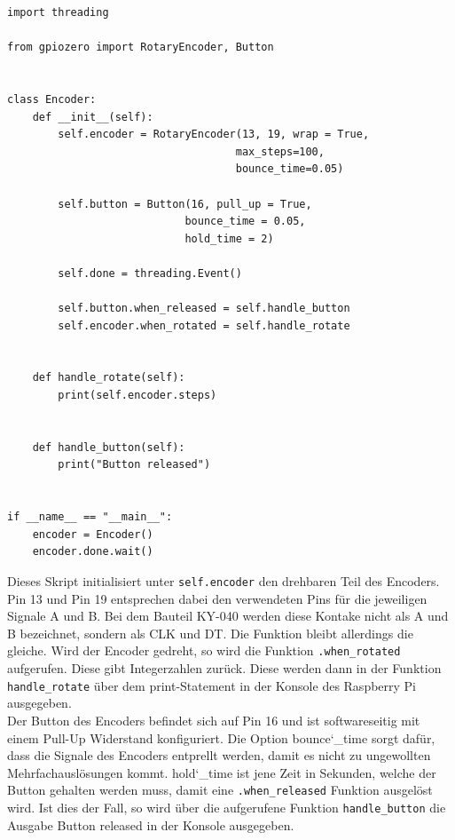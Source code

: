 \begin{scriptsize}
\begin{lstlisting}[captionpos=b, caption = {Erstes Beispiel für die Einbindung eines Rotary Encoders}]
import threading

from gpiozero import RotaryEncoder, Button


class Encoder:
    def __init__(self):
        self.encoder = RotaryEncoder(13, 19, wrap = True,
									max_steps=100,
									bounce_time=0.05)

        self.button = Button(16, pull_up = True, 
							bounce_time = 0.05,
							hold_time = 2)

        self.done = threading.Event()

        self.button.when_released = self.handle_button  
        self.encoder.when_rotated = self.handle_rotate


    def handle_rotate(self):
        print(self.encoder.steps)


    def handle_button(self):
        print("Button released")


if __name__ == "__main__":
    encoder = Encoder()
    encoder.done.wait()
\end{lstlisting}
\end{scriptsize}

Dieses Skript initialisiert unter \verb|self.encoder| den drehbaren Teil des Encoders. Pin 13 und Pin 19 entsprechen 
dabei den verwendeten Pins für die jeweiligen Signale A und B. Bei dem Bauteil KY-040 werden diese Kontake nicht als 
\glqq A\grqq{} und \glqq B\grqq{} bezeichnet, sondern als \glqq CLK\grqq{} und \glqq DT\grqq{}. Die Funktion bleibt 
allerdings die gleiche. Wird der Encoder gedreht, so wird die Funktion \verb|.when_rotated| aufgerufen. Diese gibt 
Integerzahlen zurück. Diese werden dann in der Funktion \verb|handle_rotate| über dem print-Statement in der Konsole 
des Raspberry Pi ausgegeben.\\

Der Button des Encoders befindet sich auf Pin 16 und ist softwareseitig mit einem Pull-Up Widerstand konfiguriert. 
Die Option \glqq bounce\char`_time\grqq{} sorgt dafür, dass die Signale des Encoders entprellt werden, damit es nicht 
zu ungewollten Mehrfachauslösungen kommt. \glqq hold\char`_time\grqq{} ist jene Zeit in Sekunden, welche der Button 
gehalten werden muss, damit eine \verb|.when_released| Funktion ausgelöst wird. Ist dies der Fall, so wird über die 
aufgerufene Funktion \verb|handle_button| die Ausgabe \glqq Button released\grqq{} in der Konsole ausgegeben.

